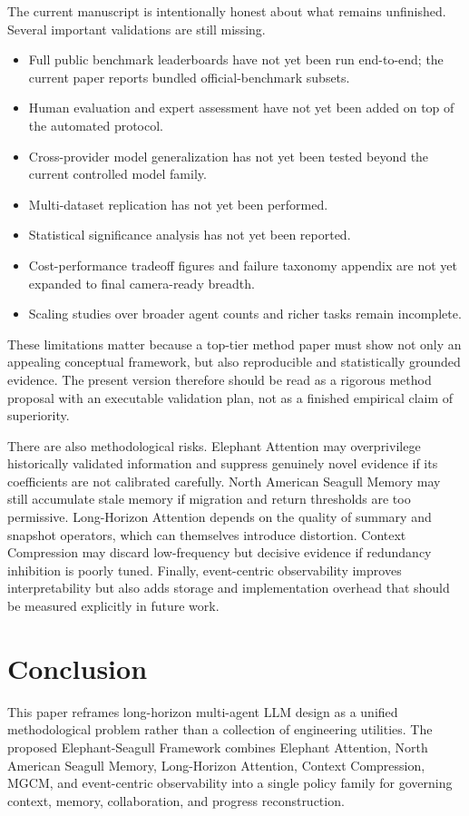 \documentclass[a4paper,fleqn]{cas-sc}
\begin{document}
The current manuscript is intentionally honest about what remains unfinished. Several important validations are still missing.
\begin{itemize}
\item Full public benchmark leaderboards have not yet been run end-to-end; the current paper reports bundled official-benchmark subsets.
\item Human evaluation and expert assessment have not yet been added on top of the automated protocol.
\item Cross-provider model generalization has not yet been tested beyond the current controlled model family.
\item Multi-dataset replication has not yet been performed.
\item Statistical significance analysis has not yet been reported.
\item Cost-performance tradeoff figures and failure taxonomy appendix are not yet expanded to final camera-ready breadth.
\item Scaling studies over broader agent counts and richer tasks remain incomplete.
\end{itemize}

These limitations matter because a top-tier method paper must show not only an appealing conceptual framework, but also reproducible and statistically grounded evidence. The present version therefore should be read as a rigorous method proposal with an executable validation plan, not as a finished empirical claim of superiority.

There are also methodological risks. Elephant Attention may overprivilege historically validated information and suppress genuinely novel evidence if its coefficients are not calibrated carefully. North American Seagull Memory may still accumulate stale memory if migration and return thresholds are too permissive. Long-Horizon Attention depends on the quality of summary and snapshot operators, which can themselves introduce distortion. Context Compression may discard low-frequency but decisive evidence if redundancy inhibition is poorly tuned. Finally, event-centric observability improves interpretability but also adds storage and implementation overhead that should be measured explicitly in future work.

\section{Conclusion}

This paper reframes long-horizon multi-agent LLM design as a unified methodological problem rather than a collection of engineering utilities. The proposed Elephant-Seagull Framework combines Elephant Attention, North American Seagull Memory, Long-Horizon Attention, Context Compression, MGCM, and event-centric observability into a single policy family for governing context, memory, collaboration, and progress reconstruction.
\end{document}
